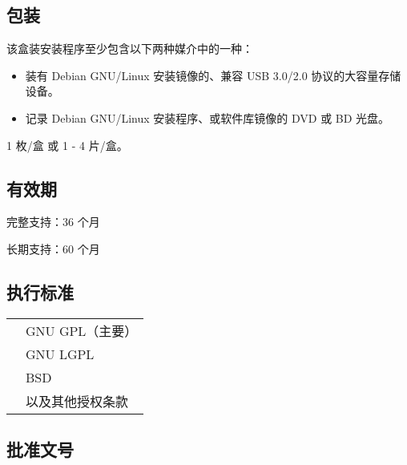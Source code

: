 \documentclass{article}
\begin{document}
\begin{multicols*}{3}
	\begin{tcolorbox}
	\section*{包装}
	\end{tcolorbox}

	该盒装安装程序至少包含以下两种媒介中的一种：
	\begin{itemize}[leftmargin=*]
		\setlength{\itemsep}{0pt}
		\setlength{\parskip}{0pt}
		\setlength{\parsep}{0pt}
		\item 装有 Debian GNU/Linux 安装镜像的、兼容 USB 3.0/2.0 协议的大容量存储设备。
		\item 记录 Debian GNU/Linux 安装程序、或软件库镜像的 DVD 或 BD 光盘。
	\end{itemize}

	1 枚/盒 或 1 - 4 片/盒。

	\medskip


	\begin{tcolorbox}
	\section*{有效期}
	\end{tcolorbox}

	完整支持：36 个月

	长期支持：60 个月

	\medskip


	\begin{tcolorbox}
	\section*{执行标准}
	\end{tcolorbox}
	\begin{tabularx}{\linewidth}{@{}ll@{}}
		\multirow{4}{*}{}{开源许可证：} & GNU GPL（主要）\\
		~ & GNU LGPL \\
		~ & BSD \\
		~ & 以及其他授权条款 \\
	\end{tabularx}

	\medskip


	\begin{tcolorbox}
	\section*{批准文号}
	\end{tcolorbox}


\end{multicols*}
\end{document}
